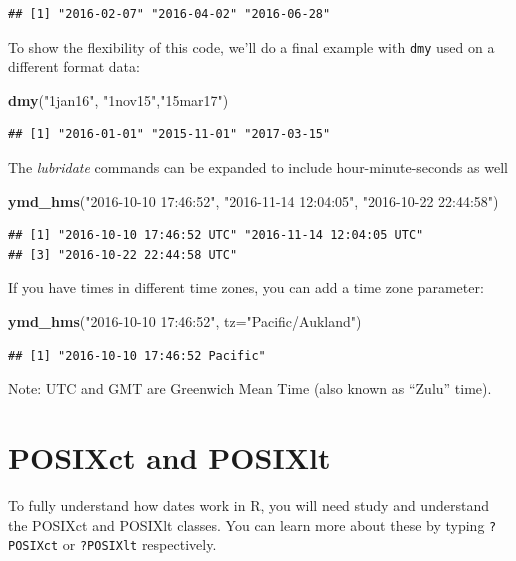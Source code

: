 \documentclass[]{book}
\newenvironment{Shaded}{\begin{snugshade}}{\end{snugshade}}
\newcommand{\KeywordTok}[1]{\textcolor[rgb]{0.13,0.29,0.53}{\textbf{{#1}}}}
\newcommand{\DataTypeTok}[1]{\textcolor[rgb]{0.13,0.29,0.53}{{#1}}}
\newcommand{\StringTok}[1]{\textcolor[rgb]{0.31,0.60,0.02}{{#1}}}
\newcommand{\NormalTok}[1]{{#1}}
\begin{document}
\begin{verbatim}
## [1] "2016-02-07" "2016-04-02" "2016-06-28"
\end{verbatim}

To show the flexibility of this code, we'll do a final example with
\texttt{dmy} used on a different format data:

\begin{Shaded}
\begin{Highlighting}[]
\KeywordTok{dmy}\NormalTok{(}\StringTok{"1jan16"}\NormalTok{, }\StringTok{"1nov15"}\NormalTok{,}\StringTok{"15mar17"}\NormalTok{)}
\end{Highlighting}
\end{Shaded}

\begin{verbatim}
## [1] "2016-01-01" "2015-11-01" "2017-03-15"
\end{verbatim}

The \emph{lubridate} commands can be expanded to include
hour-minute-seconds as well

\begin{Shaded}
\begin{Highlighting}[]
\KeywordTok{ymd_hms}\NormalTok{(}\StringTok{"2016-10-10 17:46:52"}\NormalTok{, }\StringTok{"2016-11-14 12:04:05"}\NormalTok{, }\StringTok{"2016-10-22 22:44:58"}\NormalTok{)}
\end{Highlighting}
\end{Shaded}

\begin{verbatim}
## [1] "2016-10-10 17:46:52 UTC" "2016-11-14 12:04:05 UTC"
## [3] "2016-10-22 22:44:58 UTC"
\end{verbatim}

If you have times in different time zones, you can add a time zone
parameter:

\begin{Shaded}
\begin{Highlighting}[]
\KeywordTok{ymd_hms}\NormalTok{(}\StringTok{"2016-10-10 17:46:52"}\NormalTok{, }\DataTypeTok{tz=}\StringTok{"Pacific/Aukland"}\NormalTok{)}
\end{Highlighting}
\end{Shaded}

\begin{verbatim}
## [1] "2016-10-10 17:46:52 Pacific"
\end{verbatim}

Note: UTC and GMT are Greenwich Mean Time (also known as ``Zulu'' time).

\section{POSIXct and POSIXlt}\label{posixct-and-posixlt}

To fully understand how dates work in R, you will need study and
understand the POSIXct and POSIXlt classes. You can learn more about
these by typing \texttt{?POSIXct} or \texttt{?POSIXlt} respectively.


\end{document}
